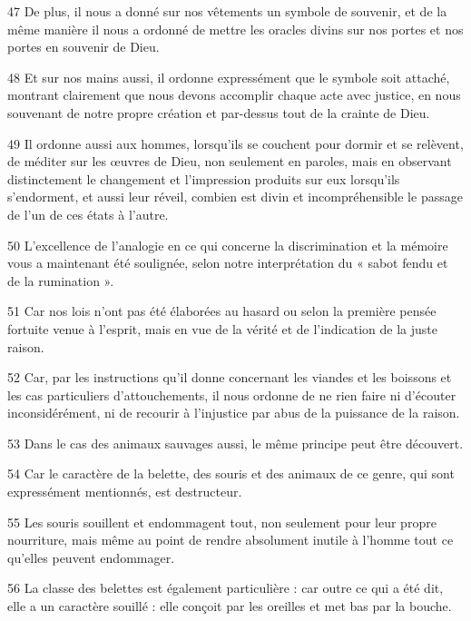 \par 47 De plus, il nous a donné sur nos vêtements un symbole de souvenir, et de la même manière il nous a ordonné de mettre les oracles divins sur nos portes et nos portes en souvenir de Dieu.

\par 48 Et sur nos mains aussi, il ordonne expressément que le symbole soit attaché, montrant clairement que nous devons accomplir chaque acte avec justice, en nous souvenant de notre propre création et par-dessus tout de la crainte de Dieu.

\par 49 Il ordonne aussi aux hommes, lorsqu'ils se couchent pour dormir et se relèvent, de méditer sur les œuvres de Dieu, non seulement en paroles, mais en observant distinctement le changement et l'impression produits sur eux lorsqu'ils s'endorment, et aussi leur réveil, combien est divin et incompréhensible le passage de l'un de ces états à l'autre.

\par 50 L'excellence de l'analogie en ce qui concerne la discrimination et la mémoire vous a maintenant été soulignée, selon notre interprétation du « sabot fendu et de la rumination ».

\par 51 Car nos lois n'ont pas été élaborées au hasard ou selon la première pensée fortuite venue à l'esprit, mais en vue de la vérité et de l'indication de la juste raison.

\par 52 Car, par les instructions qu'il donne concernant les viandes et les boissons et les cas particuliers d'attouchements, il nous ordonne de ne rien faire ni d'écouter inconsidérément, ni de recourir à l'injustice par abus de la puissance de la raison.

\par 53 Dans le cas des animaux sauvages aussi, le même principe peut être découvert.

\par 54 Car le caractère de la belette, des souris et des animaux de ce genre, qui sont expressément mentionnés, est destructeur.

\par 55 Les souris souillent et endommagent tout, non seulement pour leur propre nourriture, mais même au point de rendre absolument inutile à l'homme tout ce qu'elles peuvent endommager.

\par 56 La classe des belettes est également particulière : car outre ce qui a été dit, elle a un caractère souillé : elle conçoit par les oreilles et met bas par la bouche.

